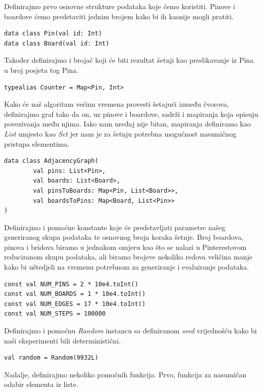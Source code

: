 \documentclass[times, utf8, seminar]{fer}
\begin{document}
Definirajmo prvo osnovne strukture podataka koje ćemo koristiti. Pinove i boardove ćemo predstaviti jednim brojem kako bi ih kasnije mogli pratiti.

\begin{lstlisting}
data class Pin(val id: Int)
data class Board(val id: Int)
\end{lstlisting}

Također definirajmo i brojač koji će biti rezultat šetnji kao preslikavanje iz Pina u broj posjeta tog Pina.

\begin{lstlisting}
typealias Counter = Map<Pin, Int>
\end{lstlisting}

Kako će naš algoritam većinu vremena provesti šetajući između čvorova, definirajmo graf tako da on, uz pinove i boardove, sadrži i mapiranja koja opisuju povezivanja među njima. Iako nam uređaj nije bitan, mapiranja definiramo kao \textit{List} umjesto kao \textit{Set} jer nam je za šetnju potrebna mogućnost nasumičnog pristupa elementima.

\begin{lstlisting}
data class AdjacencyGraph(
        val pins: List<Pin>,
        val boards: List<Board>,
        val pinsToBoards: Map<Pin, List<Board>>,
        val boardsToPins: Map<Board, List<Pin>>
)
\end{lstlisting}

Definirajmo i pomoćne konstante koje će predstavljati parametre našeg generiranog skupa podataka te osnovnog broja koraka šetnje. Broj boardova, pinova i bridova biramo u jednakom omjeru kao što se nalazi u Pinterestovom reduciranom skupu podataka, ali biramo brojeve nekoliko redova veličina manje kako bi uštedjeli na vremenu potrebnom za generiranje i evaluiranje podataka.

\begin{lstlisting}
const val NUM_PINS = 2 * 10e4.toInt()
const val NUM_BOARDS = 1 * 10e4.toInt()
const val NUM_EDGES = 17 * 10e4.toInt()
const val NUM_STEPS = 100000
\end{lstlisting}

Definirajmo i pomoćnu \textit{Random} instancu sa definiranom \textit{seed} vrijednošću kako bi naši eksperimenti bili deterministični.

\begin{lstlisting}
val random = Random(9932L)
\end{lstlisting}

Nadalje, definirajmo nekoliko pomoćnih funkcija. Prvo, funkcija za nasumičan odabir elementa iz liste.
\end{document}
